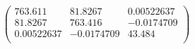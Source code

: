 \documentclass{article}
\begin{document}
\[\left(
\begin{array}{ccc}
 763.611 & 81.8267 & 0.00522637 \\
 81.8267 & 763.416 & -0.0174709 \\
 0.00522637 & -0.0174709 & 43.484 \\
\end{array}
\right)\]
\end{document}
